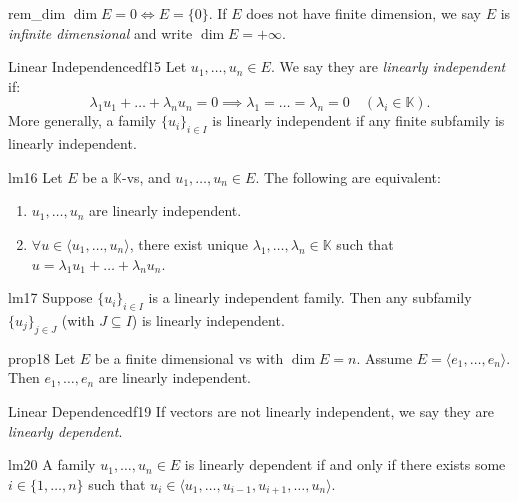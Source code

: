 \documentclass[11pt, a4paper]{article}
\newcommand{\K}{\mathbb{K}}
\begin{document}
\begin{remark}{}{rem_dim}
  $\dim E = 0 \iff E = \{0\}$. If $E$ does not have finite dimension, we say $E$ is \emph{infinite dimensional} and write $\dim E = +\infty$.
\end{remark}

\begin{definition}{Linear Independence}{df15}
  Let $u_1, \dots, u_n \in E$. We say they are \emph{linearly independent} if:
  \[
    \lambda_1 u_1 + \dots + \lambda_n u_n = 0 \implies \lambda_1 = \dots = \lambda_n = 0 \quad (\lambda_i \in \K).
  \]
  More generally, a family $\{u_i\}_{i \in I}$ is linearly independent if any finite subfamily is linearly independent.
\end{definition}

\begin{lemma}{}{lm16}
  Let $E$ be a $\K$-vs, and $u_1, \dots, u_n \in E$. The following are equivalent:
  \begin{enumerate}
    \item $u_1, \dots, u_n$ are linearly independent.
    \item $\forall u \in \langle u_1, \dots, u_n \rangle$, there exist unique $\lambda_1, \dots, \lambda_n \in \K$ such that $u = \lambda_1 u_1 + \dots + \lambda_n u_n$.
  \end{enumerate}
\end{lemma}

\begin{lemma}{}{lm17}
  Suppose $\{u_i\}_{i \in I}$ is a linearly independent family. Then any subfamily $\{u_j\}_{j \in J}$ (with $J \subseteq I$) is linearly independent.
\end{lemma}

\begin{proposition}{}{prop18}
  Let $E$ be a finite dimensional vs with $\dim E = n$. Assume $E = \langle e_1, \dots, e_n \rangle$. Then $e_1, \dots, e_n$ are linearly independent.
\end{proposition}

\begin{definition}{Linear Dependence}{df19}
  If vectors are not linearly independent, we say they are \emph{linearly dependent}.
\end{definition}

\begin{lemma}{}{lm20}
  A family $u_1, \dots, u_n \in E$ is linearly dependent if and only if there exists some $i \in \{1, \dots, n\}$ such that $u_i \in \langle u_1, \dots, u_{i-1}, u_{i+1}, \dots, u_n \rangle$.
\end{lemma}
\end{document}
